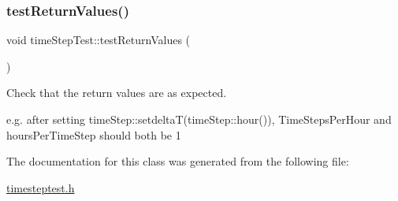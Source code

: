\subsubsection{\texorpdfstring{test\+Return\+Values()}{testReturnValues()}}
{\footnotesize\ttfamily void time\+Step\+Test\+::test\+Return\+Values (\begin{DoxyParamCaption}{ }\end{DoxyParamCaption})\hspace{0.3cm}{\ttfamily [inline]}}



Check that the return values are as expected. 

e.\+g. after setting time\+Step\+::setdelta\+T(time\+Step\+::hour()), Time\+Steps\+Per\+Hour and hours\+Per\+Time\+Step should both be 1 

The documentation for this class was generated from the following file\+:\begin{DoxyCompactItemize}
\item 
\mbox{\hyperlink{timesteptest_8h}{timesteptest.\+h}}\end{DoxyCompactItemize}
